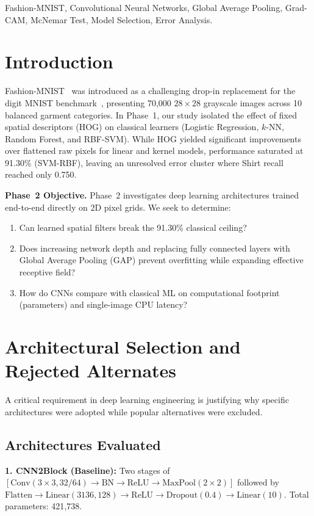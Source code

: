 \documentclass[conference]{IEEEtran}
\begin{document}
\begin{IEEEkeywords}
Fashion-MNIST, Convolutional Neural Networks, Global Average Pooling, Grad-CAM, McNemar Test, Model Selection, Error Analysis.
\end{IEEEkeywords}

\section{Introduction}
Fashion-MNIST~\cite{xiao2017} was introduced as a challenging drop-in replacement for the digit MNIST benchmark~\cite{lecun1998}, presenting 70{,}000 $28\times28$ grayscale images across 10 balanced garment categories. In Phase~1, our study isolated the effect of fixed spatial descriptors (HOG) on classical learners (Logistic Regression, $k$-NN, Random Forest, and RBF-SVM). While HOG yielded significant improvements over flattened raw pixels for linear and kernel models, performance saturated at 91.30\% (SVM-RBF), leaving an unresolved error cluster where Shirt recall reached only 0.750.

\textbf{Phase~2 Objective.} Phase~2 investigates deep learning architectures trained end-to-end directly on 2D pixel grids. We seek to determine:
\begin{enumerate}
\item Can learned spatial filters break the 91.30\% classical ceiling?
\item Does increasing network depth and replacing fully connected layers with Global Average Pooling (GAP) prevent overfitting while expanding effective receptive field?
\item How do CNNs compare with classical ML on computational footprint (parameters) and single-image CPU latency?
\end{enumerate}

\section{Architectural Selection and Rejected Alternates}
A critical requirement in deep learning engineering is justifying why specific architectures were adopted while popular alternatives were excluded.

\subsection{Architectures Evaluated}
\textbf{1. CNN2Block (Baseline):} Two stages of $[\mathrm{Conv}(3\times3, 32/64) \to \mathrm{BN} \to \mathrm{ReLU} \to \mathrm{MaxPool}(2\times2)]$ followed by $\mathrm{Flatten} \to \mathrm{Linear}(3136, 128) \to \mathrm{ReLU} \to \mathrm{Dropout}(0.4) \to \mathrm{Linear}(10)$. Total parameters: 421{,}738.
\end{document}
